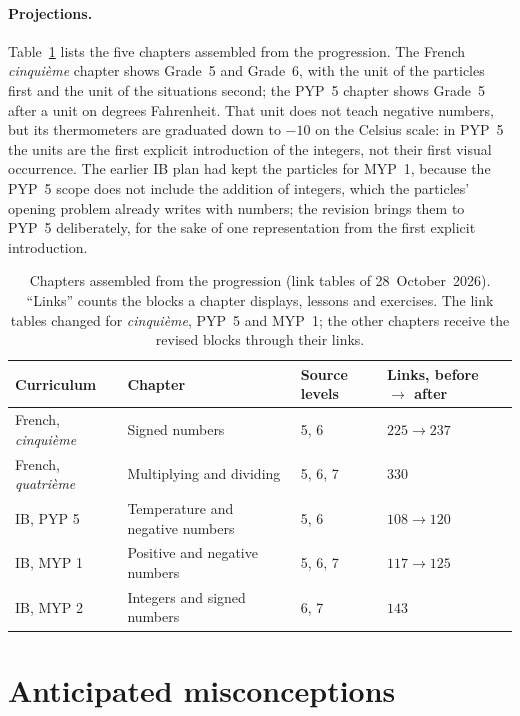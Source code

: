 \documentclass[11pt,a4paper]{article}
\theoremstyle{definition}
\begin{document}
\paragraph{Projections.} Table~\ref{tab:projections} lists the five chapters assembled from the progression. The French \emph{cinqui\`eme} chapter shows Grade~5 and Grade~6, with the unit of the particles first and the unit of the situations second; the PYP~5 chapter shows Grade~5 after a unit on degrees Fahrenheit. That unit does not teach negative numbers, but its thermometers are graduated down to $-10$ on the Celsius scale: in PYP~5 the units are the first explicit introduction of the integers, not their first visual occurrence. The earlier IB plan had kept the particles for MYP~1, because the PYP~5 scope does not include the addition of integers, which the particles' opening problem already writes with numbers; the revision brings them to PYP~5 deliberately, for the sake of one representation from the first explicit introduction.

\begin{table}[htbp]
\centering\small
\caption{Chapters assembled from the progression (link tables of 28~October~2026). ``Links'' counts the blocks a chapter displays, lessons and exercises. The link tables changed for \emph{cinqui\`eme}, PYP~5 and MYP~1; the other chapters receive the revised blocks through their links.}
\label{tab:projections}
\begin{tabular}{llll}
\toprule
Curriculum & Chapter & Source levels & Links, before $\to$ after \\
\midrule
French, \emph{cinqui\`eme} & Signed numbers & 5, 6 & $225\to237$ \\
French, \emph{quatri\`eme} & Multiplying and dividing & 5, 6, 7 & $330$ \\
IB, PYP 5 & Temperature and negative numbers & 5, 6 & $108\to120$ \\
IB, MYP 1 & Positive and negative numbers & 5, 6, 7 & $117\to125$ \\
IB, MYP 2 & Integers and signed numbers & 6, 7 & $143$ \\
\bottomrule
\end{tabular}
\end{table}

\section{Anticipated misconceptions}\label{sec:misconceptions}
\end{document}
